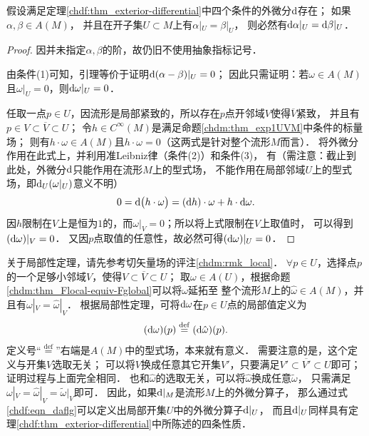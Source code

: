 \begin{lemma}\label{chdf:thm_d-exterior-local}
    假设满足定理\ref{chdf:thm_exterior-differential}中四个条件的外微分${\rm d}$存在；
    如果$\alpha, \beta \in A(M)$，
    并且在开子集$U\subset M$上有$\alpha|_U = \beta|_U$，
    则必然有${\rm d}\alpha|_U = {\rm d}\beta|_U$．
\end{lemma}
\begin{proof}
    因并未指定$\alpha,\beta$的阶，故仍旧不使用抽象指标记号．



    由条件(1)可知，引理等价于证明${\rm d}(\alpha-\beta)|_U = 0$；
    因此只需证明：若$\omega \in A(M)$且$\omega|_U=0$，则${\rm d}\omega|_U =0$．

    任取一点$p\in U$，因流形是局部紧致的，所以存在$p$点开邻域$V$使得$\overline{V}$紧致，
    并且有$p \in V \subset \overline{V} \subset U$；
    令$h\in C^\infty(M)$是满足命题\ref{chdm:thm_exp1UVM}中条件的标量场；
    则有$h\cdot \omega \in A(M)$且$ h\cdot \omega =0$（这两式是针对整个流形$M$而言）．
    将外微分作用在此式上，并利用准Leibniz律（条件(2)）和条件(3)，
    有（需注意：截止到此处，外微分${\rm d}$只能作用在流形$M$上的型式场，
    不能作用在局部邻域$U$上的型式场，即${\rm d}_U (\omega|_U)$意义不明）
    \begin{equation*}
        0={\rm d}\bigl(h\cdot \omega\bigr)=( {\rm d}h ) \cdot \omega + h \cdot {\rm d}\omega.
    \end{equation*}
    因$h$限制在$V$上是恒为$1$的，而$\omega|_V=0$；所以将上式限制在$V$上取值时，
    可以得到$({\rm d}\omega)|_V=0$．
    又因$p$点取值的任意性，故必然可得$({\rm d}\omega)|_U=0$．
\end{proof}



关于局部性定理，请先参考切矢量场的评注\ref{chdm:rmk_local}．
$\forall p\in U$，选择点$p$的一个足够小邻域$V$，使得$V\subset \overline{V} \subset U$；
取$\omega \in A(U)$，根据命题\ref{chdm:thm_Flocal-equiv-Fglobal}可以将$\omega$延拓至
整个流形$M$上的$\hat{\omega}\in A(M)$，并且有$\omega|_V= \hat{\omega}|_V$．
根据局部性定理，可将${\rm d}\omega$在$p\in U$点的局部值定义为
\begin{equation}\label{chdf:eqn_daflg}
    ({\rm d}\omega )(p) \overset{\mathrm {def}}{=} ({\rm d}\hat{\omega} )(p) .
\end{equation}
定义号“$\overset{\mathrm {def}}{=}$”右端是$A(M)$中的型式场，本来就有意义．
需要注意的是，这个定义与开集$V$选取无关；
可以将$V$换成任意其它开集$V'$，只要满足$V' \subset \overline{V'} \subset U$即可；
证明过程与上面完全相同．
也和$\hat{\omega}$的选取无关，可以将$\hat{\omega}$换成任意$\tilde{\omega}$，
只需满足$\omega|_V=\hat{\omega}|_V=\tilde{\omega}|_V$即可．
因此，如果${\rm d}|_M$是流形$M$上的外微分算子，
那么通过式\eqref{chdf:eqn_daflg}可以定义出局部开集$U$中的外微分算子${\rm d}|_U$，
而且${\rm d}|_U$同样具有定理\ref{chdf:thm_exterior-differential}中所陈述的四条性质．

